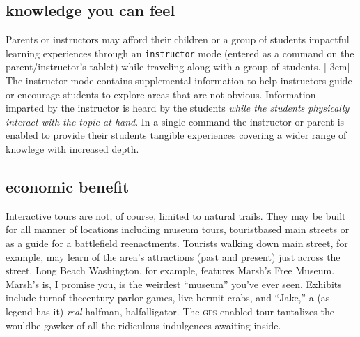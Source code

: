 \subsection{knowledge you can feel}
\noindent Parents or instructors may afford their children or a group of students impactful
learning experiences through an \texttt{\scriptsize{instructor}} mode (entered as a command
on the parent/instructor's tablet) 
while traveling along with a group of students.
[-3em]
The instructor mode contains
supplemental information to help instructors guide or encourage students to explore areas
that are not obvious. Information imparted by the instructor is heard
by the students \emph{while the students physically interact with the topic at
  hand}. In a single command the instructor or parent is enabled to provide
their students tangible experiences covering a wider range of knowlege with increased depth.  

\subsection{economic benefit}
Interactive tours are not, of course, limited to natural trails. They may be
built for all manner of locations including museum
tours, tourist\textendash based main streets or as a guide for a battlefield
reenactments.
Tourists walking down main street, for example, may learn of the area's
attractions (past and present) just across the street. Long Beach Washington,
for example, features Marsh's Free Museum. Marsh's is, I promise you, is the weirdest
``museum'' you've ever seen. Exhibits include turn\textendash of\textendash
the\textendash century parlor games, live hermit crabs, and ``Jake,'' a (as
legend has it) \emph{real} half\textendash man, half\textendash alligator.
The \textsc{gps\textendash} enabled tour tantalizes the would\textendash be
gawker of all the ridiculous indulgences awaiting inside.

